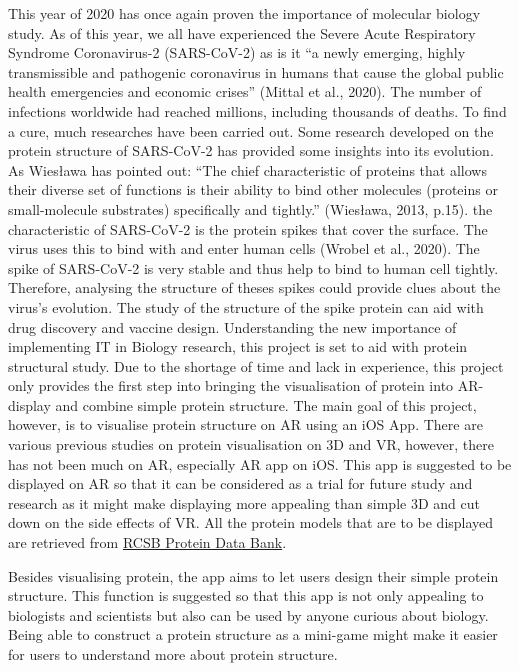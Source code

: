 This year of 2020 has once again proven the importance of molecular biology study. As of this year, we all have experienced the Severe Acute Respiratory Syndrome Coronavirus-2 (SARS-CoV-2) as is it “a newly emerging, highly transmissible and pathogenic coronavirus in humans that cause the global public health emergencies and economic crises” (Mittal et al., 2020). The number of infections worldwide had reached millions, including thousands of deaths. To find a cure, much researches have been carried out. Some research developed on the protein structure of SARS-CoV-2 has provided some insights into its evolution. As Wiesława has pointed out: “The chief characteristic of proteins that allows their diverse set of functions is their ability to bind other molecules (proteins or small-molecule substrates) specifically and tightly.” (Wiesława, 2013, p.15). the characteristic of SARS-CoV-2 is the protein spikes that cover the surface. The virus uses this to bind with and enter human cells (Wrobel et al., 2020). The spike of SARS-CoV-2 is very stable and thus help to bind to human cell tightly. Therefore, analysing the structure of theses spikes could provide clues about the virus’s evolution. The study of the structure of the spike protein can aid with drug discovery and vaccine design. 
Understanding the new importance of implementing IT in Biology research, this project is set to aid with protein structural study.
Due to the shortage of time and lack in experience, this project only provides the first step into bringing the visualisation of protein into AR-display and combine simple protein structure. The main goal of this project, however, is to visualise protein structure on AR using an iOS App. 
There are various previous studies on protein visualisation on 3D and VR, however, there has not been much on AR, especially AR app on iOS. This app is suggested to be displayed on AR so that it can be considered as a trial for future study and research as it might make displaying more appealing than simple 3D and cut down on the side effects of VR. All the protein models that are to be displayed are retrieved from \href{https://www.rcsb.org/}{RCSB Protein Data Bank}. 

Besides visualising protein, the app aims to let users design their simple protein structure. This function is suggested so that this app is not only appealing to biologists and scientists but also can be used by anyone curious about biology. Being able to construct a protein structure as a mini-game might make it easier for users to understand more about protein structure. 

